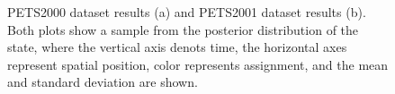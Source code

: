 \documentclass[smallcondensed, final]{svjour3}
\begin{document}
\begin{figure}
  \centering
  \caption{PETS2000 dataset results (a) and PETS2001 dataset results (b). Both plots show a sample from the posterior distribution of the state, where the vertical axis denots time, the horizontal axes represent spatial position, color represents assignment, and the mean and standard deviation are shown.}
  \label{fig:benchmark_results}
\end{figure}

\end{document}
